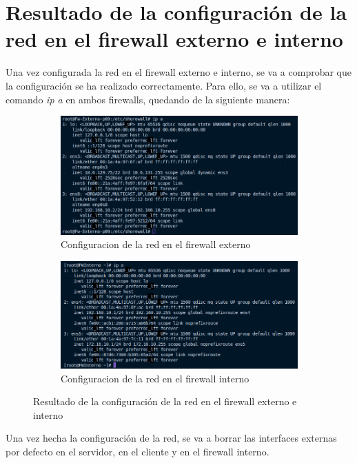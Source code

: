 \documentclass[11pt]{report}
\begin{document}
\section{Resultado de la configuración de la red en el firewall externo e interno}
Una vez configurada la red en el firewall externo e interno, se va a comprobar que la configuración
se ha realizado correctamente. Para ello, se va a utilizar el comando \emph{ip a} en ambos firewalls,
quedando de la siguiente manera:
\begin{figure}[H]
  \begin{subfigure}{0.5\textwidth}
    \centering
    \includegraphics[scale=0.35]{img/ip_a_fw_externo.png}
    \caption{Configuracion de la red en el firewall externo}
  \end{subfigure}%
  \begin{subfigure}{0.5\textwidth}
    \centering
    \includegraphics[scale=0.38]{img/ip_a_fw_interno.png}
    \caption{Configuracion de la red en el firewall interno}
  \end{subfigure}
  \caption{Resultado de la configuración de la red en el firewall externo e interno}
\end{figure}

Una vez hecha la configuración de la red, se va a borrar las interfaces externas por defecto
en el servidor, en el cliente y en el firewall interno.
\end{document}
